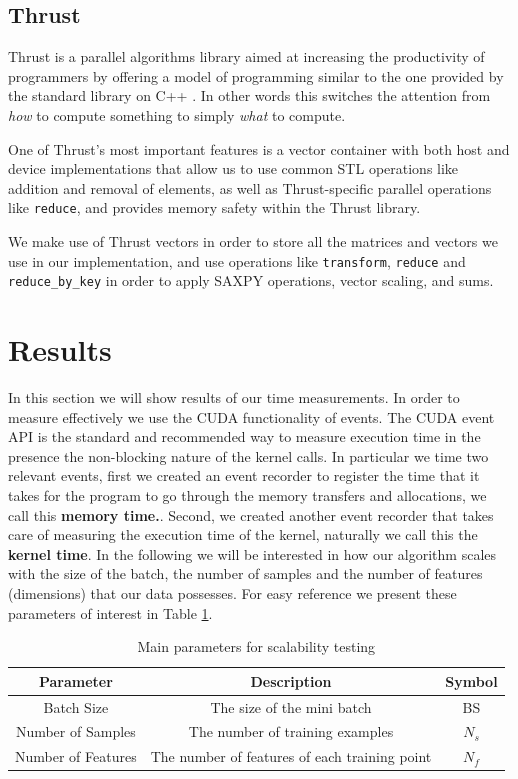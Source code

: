 \documentclass[11pt,a4paper]{article}
\begin{document}
\subsection{Thrust}
Thrust is a parallel algorithms library aimed at increasing the productivity of programmers by
offering a model of programming similar to the one provided by the standard library on C++
\citep{bell2012thrust}. In other words this switches the attention from \textit{how} to compute
something to simply \textit{what} to compute. 

One of Thrust's most important features is a vector container with both host and device implementations that allow us
to use common STL operations like addition and removal of elements, as well as Thrust-specific parallel operations like \texttt{reduce}, and provides memory safety within the Thrust library.

We make use of Thrust vectors in order to store all the matrices and vectors we use
in our implementation, and use operations like \texttt{transform}, \texttt{reduce} and \texttt{reduce\_by\_key} in order to apply SAXPY operations, vector scaling, and sums.


\section{Results}

In this section we will show results of our time measurements. In order to measure effectively we
use the CUDA functionality of events. The CUDA event API is the standard and recommended way to 
measure execution time in the presence the non-blocking  nature of the kernel calls. 
In particular we time two relevant events, first we created an event recorder to 
register the time that it takes for the program to go through the memory transfers 
and allocations, we call this \textbf{memory time.}. Second, we created another event
recorder that takes care of measuring the execution time of the kernel, naturally we 
call this the \textbf{kernel time}. In the following we will be interested in how our 
algorithm scales with the size of the batch, the number of samples and the number 
of features (dimensions) that our data possesses. For easy 
reference we present these parameters of interest in Table \ref{table:parameters}.


\begin{table}[H]
\centering
\begin{tabular}{|c|c|c|}
\hline
Parameter & Description & Symbol\\
\hline
Batch Size & The size of the mini batch & BS \\
\hline
Number of Samples & The number of training examples & $N_s$ \\
\hline
Number of Features & The number of features of each training point & $N_f$ \\
\hline
\end{tabular}
\caption{Main parameters for scalability testing}
\label{table:parameters}
\end{table}
\end{document}
